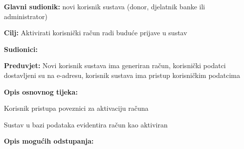 					
					\noindent {}
					\begin{packed_item}  \label{UC3}
	
						\item \textbf{Glavni sudionik: }novi korisnik sustava (donor, djelatnik banke ili administrator)
						\item  \textbf{Cilj:} Aktivirati korisnički račun radi buduće prijave u sustav
						\item  \textbf{Sudionici:} 
						\item  \textbf{Preduvjet:} Novi korisnik sustava ima generiran račun, korisnički podatci dostavljeni su na e-adresu, korisnik sustava ima pristup korisničkim podatcima
						\item  \textbf{Opis osnovnog tijeka:}
						
						\item[] \begin{packed_enum}
	
	                        \item Korisnik pristupa poveznici za aktivaciju računa
	                        \item Sustav u bazi podataka evidentira račun kao aktiviran

						\end{packed_enum}
						
						\item  \textbf{Opis mogućih odstupanja:}
						
					\end{packed_item}
					
